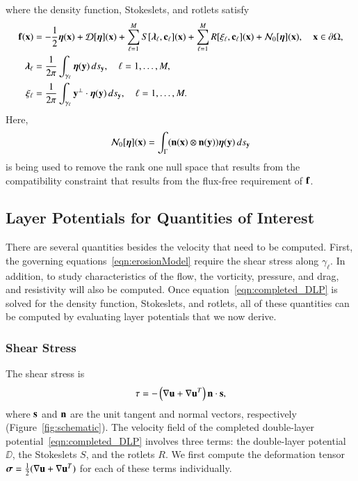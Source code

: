 \documentclass[preprint, 10pt]{elsarticle}
\begin{document}
where the density function, Stokeslets, and rotlets satisfy
\begin{subequations}
\label{eqn:completed_BIE}
\begin{align}
  \ff(\xx) &= -\frac{1}{2}\eeta(\xx) + \DD[\eeta](\xx) + 
      \sum_{\ell=1}^{M} S[\llambda_\ell,\cc_\ell](\xx) +
      \sum_{\ell=1}^{M} R[\xi_\ell,\cc_\ell](\xx) + \NN_0[\eeta](\xx),
      \quad \xx \in \bd\Omega, 
      \label{eqn:DLP}\\
  \llambda_\ell &= \frac{1}{2\pi}\int_{\gamma_\ell} \eeta(\yy) \, ds_\yy,
  \quad \ell=1,\ldots,M,
  \label{eqn:stokeslet} \\
  \xi_\ell &= \frac{1}{2\pi}\int_{\gamma_\ell} \yy^\perp \cdot \eeta(\yy)
  \, ds_\yy, \quad \ell=1,\ldots,M.
  \label{eqn:rotlet}
\end{align}
\end{subequations}
Here,
\begin{align*}
  \NN_0[\eeta](\xx) = \int_{\Gamma} 
    (\nn(\xx) \otimes \nn(\yy))\eeta(\yy) \, ds_\yy
\end{align*}
is being used to remove the rank one null space that results from the
compatibility constraint that results from the flux-free requirement of
$\ff$.


\subsection{Layer Potentials for Quantities of Interest}
\label{sec:qois}
There are several quantities besides the velocity that need to be
computed.  First, the governing equations~\eqref{eqn:erosionModel}
require the shear stress along $\gamma_\ell$.  In addition, to study
characteristics of the flow, the vorticity, pressure, and drag, and
resistivity will also be computed.  Once
equation~\eqref{eqn:completed_DLP} is solved for the density function,
Stokeslets, and rotlets, all of these quantities can be computed by
evaluating layer potentials that we now derive.

\subsubsection{Shear Stress}
The shear stress is
\begin{align*}
  \tau = -\left(\nabla \uu + \nabla \uu^T \right)\nn \cdot \ss,
\end{align*}
where $\ss$ and $\nn$ are the unit tangent and normal vectors,
respectively (Figure~\ref{fig:schematic}).  The velocity field of the
completed double-layer potential~\eqref{eqn:completed_DLP} involves
three terms: the double-layer potential $\DD$, the Stokeslets $S$, and
the rotlets $R$.  We first compute the deformation tensor $\ssigma =
\frac{1}{2}(\nabla\uu + \nabla\uu^T)$ for each of these terms
individually.
\end{document}
